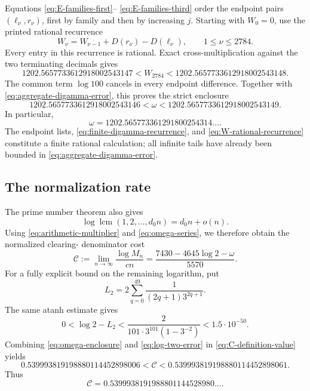 \documentclass[11pt,reqno,letterpaper]{amsart}
\numberwithin{equation}{section}
\theoremstyle{definition}
\theoremstyle{remark}
\DeclareMathOperator{\lcm}{lcm}
\begin{document}
Equations \eqref{eq:E-families-first}--
\eqref{eq:E-families-third} order the endpoint pairs
\((\ell_\nu,r_\nu)\), first by family and then by increasing \(j\).
Starting with \(W_0=0\), use the printed rational recurrence
\begin{equation}\label{eq:W-rational-recurrence}
 W_\nu=W_{\nu-1}+D(r_\nu)-D(\ell_\nu),
 \qquad1\leq\nu\leq2784.
\end{equation}
Every entry in this recurrence is rational.  Exact cross-multiplication
against the two terminating decimals gives
\begin{equation}\label{eq:W-exact-enclosure}
 1202.5657733612918002543147
 <W_{2784}<
 1202.5657733612918002543148.
\end{equation}
The common term \(\log100\) cancels in every endpoint difference.
Together with \eqref{eq:aggregate-digamma-error}, this proves the strict
enclosure
\begin{equation}\label{eq:omega-enclosure}
 \boxed{
 1202.5657733612918002543146
 <\omega<
 1202.5657733612918002543149.}
\end{equation}
In particular,
\[
 \omega=1202.565773361291800254314\ldots .
\]
The endpoint lists, \eqref{eq:finite-digamma-recurrence}, and
\eqref{eq:W-rational-recurrence} constitute a finite rational
calculation; all infinite tails have already been bounded in
\eqref{eq:aggregate-digamma-error}.

\subsection{The normalization rate}

The prime number theorem also gives
\[
 \log\lcm(1,2,\ldots,d_0n)=d_0n+o(n).
\]
Using \eqref{eq:arithmetic-multiplier} and
\eqref{eq:omega-series}, we therefore obtain the normalized clearing-
denominator cost
\begin{equation}\label{eq:C-definition-value}
 \mathcal C:=\lim_{n\to\infty}\frac{\log M_n}{cn}
 =\frac{7430-4645\log2-\omega}{5570}.
\end{equation}
For a fully explicit bound on the remaining logarithm, put
\begin{equation}\label{eq:log-two-series}
 L_2=2\sum_{q=0}^{49}\frac{1}{(2q+1)3^{2q+1}}.
\end{equation}
The same atanh estimate gives
\begin{equation}\label{eq:log-two-error}
 0<\log2-L_2
 <\frac{2}{101\cdot3^{101}(1-3^{-2})}<1.5\cdot10^{-50}.
\end{equation}
Combining \eqref{eq:omega-enclosure} and
\eqref{eq:log-two-error} in \eqref{eq:C-definition-value} yields
\begin{equation}\label{eq:C-enclosure}
 \boxed{
 0.539993819198880114452898006
 <\mathcal C<
 0.539993819198880114452898061.}
\end{equation}
Thus
\[
 \mathcal C=0.5399938191988801144528980\ldots .
\]
\end{document}
